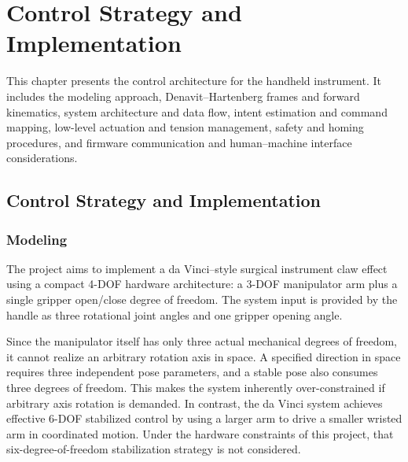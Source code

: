 




\chapter{Control Strategy and Implementation} %
\label{Chapter9}
\begin{chaptersummary}
This chapter presents the control architecture for the handheld instrument. It includes the modeling approach, Denavit–Hartenberg frames and forward kinematics, system architecture and data flow, intent estimation and command mapping, low-level actuation and tension management, safety and homing procedures, and firmware communication and human–machine interface considerations.
\end{chaptersummary}
\section{Control Strategy and Implementation}
\subsection{Modeling}

The project aims to implement a da Vinci–style surgical instrument claw effect using a compact 4-DOF hardware architecture: a 3-DOF manipulator arm plus a single gripper open/close degree of freedom. The system input is provided by the handle as three rotational joint angles and one gripper opening angle.

Since the manipulator itself has only three actual mechanical degrees of freedom, it cannot realize an arbitrary rotation axis in space. A specified direction in space requires three independent pose parameters, and a stable pose also consumes three degrees of freedom. This makes the system inherently over-constrained if arbitrary axis rotation is demanded. In contrast, the da Vinci system achieves effective 6-DOF stabilized control by using a larger arm to drive a smaller wristed arm in coordinated motion. Under the hardware constraints of this project, that six-degree-of-freedom stabilization strategy is not considered.

